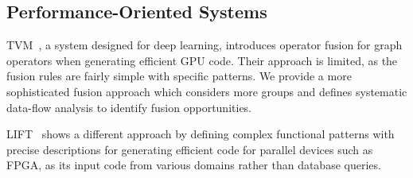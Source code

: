 
\subsection{Performance-Oriented Systems}

TVM~\cite{Chen18:TVM}, a system designed for deep learning, introduces
operator fusion for graph operators when generating efficient GPU code.
Their approach is limited, as the fusion rules are fairly simple
with specific patterns.
We provide a more sophisticated fusion approach which considers more groups
and defines systematic data-flow analysis to identify fusion opportunities.

LIFT~\cite{Kristien19:LiftPatterns} shows a different approach by defining
complex functional patterns with precise descriptions for generating efficient
code for parallel devices such as FPGA, as its input code from various domains
rather than database queries.




